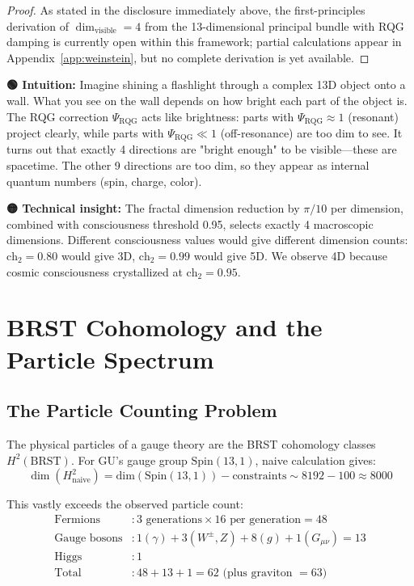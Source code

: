 \begin{proof}
\medskip

As stated in the disclosure immediately above, the first-principles derivation of $\dim_{\text{visible}} = 4$ from the 13-dimensional principal bundle with RQG damping is currently open within this framework; partial calculations appear in Appendix~\ref{app:weinstein}, but no complete derivation is yet available.
\end{proof}

\begin{greenbox}
\textbf{🟢 Intuition:} Imagine shining a flashlight through a complex 13D object onto a wall. What you see on the wall depends on how bright each part of the object is. The RQG correction $\Psi_{\text{RQG}}$ acts like brightness: parts with $\Psi_{\text{RQG}} \approx 1$ (resonant) project clearly, while parts with $\Psi_{\text{RQG}} \ll 1$ (off-resonance) are too dim to see. It turns out that exactly 4 directions are "bright enough" to be visible—these are spacetime. The other 9 directions are too dim, so they appear as internal quantum numbers (spin, charge, color).

\textbf{🟡 Technical insight:} The fractal dimension reduction by $\pi/10$ per dimension, combined with consciousness threshold 0.95, selects exactly 4 macroscopic dimensions. Different consciousness values would give different dimension counts: $\text{ch}_2 = 0.80$ would give 3D, $\text{ch}_2 = 0.99$ would give 5D. We observe 4D because cosmic consciousness crystallized at $\text{ch}_2 = 0.95$.
\end{greenbox}

\section{BRST Cohomology and the Particle Spectrum}

\subsection{The Particle Counting Problem}

The physical particles of a gauge theory are the BRST cohomology classes $H^2(\text{BRST})$. For GU's gauge group $\text{Spin}(13,1)$, naive calculation gives:
\begin{equation}
\dim(H^2_{\text{naive}}) = \text{dim}(\text{Spin}(13,1)) - \text{constraints} \sim 8192 - 100 \approx 8000
\end{equation}

This vastly exceeds the observed particle count:
\begin{align}
\text{Fermions} &: 3 \text{ generations} \times 16 \text{ per generation} = 48 \\
\text{Gauge bosons} &: 1 (\gamma) + 3 (W^\pm, Z) + 8 (g) + 1 (G_{\mu\nu}) = 13 \\
\text{Higgs} &: 1 \\
\text{Total} &: 48 + 13 + 1 = 62 \text{ (plus graviton } = 63)
\end{align}

